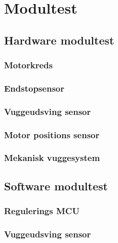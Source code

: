 \section{Modultest}
\subsection{Hardware modultest}
\subsubsection{Motorkreds}

\subsubsection{Endstopsensor}

\subsubsection{Vuggeudsving sensor}

\subsubsection{Motor positions sensor}

\subsubsection{Mekanisk vuggesystem}


\subsection{Software modultest}
\subsubsection{Regulerings MCU}
\subsubsection{Vuggeudsving sensor}
